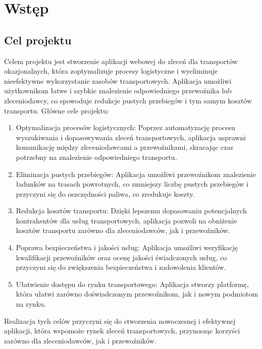 \chapter{Wstęp}

\section{Cel projektu}
Celem projektu jest stworzenie aplikacji webowej do zleceń dla transportów okazjonalnych, która zoptymalizuje procesy logistyczne i wyeliminuje nieefektywne wykorzystanie zasobów transportowych. Aplikacja umożliwi użytkownikom łatwe i szybkie znalezienie odpowiedniego przewoźnika lub zleceniodawcy, co spowoduje redukcje pustych przebiegów i tym samym kosztów transportu.
Główne cele projektu:
\begin{enumerate}[labelwidth=\widthof{\ref{last-item}},label=\arabic*.]
\item Optymalizacja procesów logistycznych: Poprzez automatyzację procesu wyszukiwania i dopasowywania zleceń transportowych, aplikacja usprawni komunikację między zleceniodawcami a przewoźnikami, skracając czas potrzebny na znalezienie odpowiedniego transportu.
\item Eliminacja pustych przebiegów: Aplikacja umożliwi przewoźnikom znalezienie ładunków na trasach powrotnych, co zmniejszy liczbę pustych przebiegów i przyczyni się do oszczędności paliwa, co zredukuje koszty.
\item Redukcja kosztów transportu: Dzięki lepszemu dopasowaniu potencjalnych kontrahentów dla usług transportowych, aplikacja pozwoli na obniżenie kosztów transportu zarówno dla zleceniodawców, jak i przewoźników.
\item Poprawa bezpieczeństwa i jakości usług: Aplikacja umożliwi weryfikację kwalifikacji przewoźników oraz ocenę jakości świadczonych usług, co przyczyni się do zwiększenia bezpieczeństwa i zadowolenia klientów.
\item Ułatwienie dostępu do rynku transportowego: Aplikacja stworzy platformę, która ułatwi zarówno doświadczonym przewoźnikom, jak i nowym podmiotom na rynku. \label{last-item}
\end{enumerate}

Realizacja tych celów przyczyni się do stworzenia nowoczesnej i efektywnej aplikacji, która wspomoże rynek zleceń transportowych, przynosząc korzyści zarówno dla zleceniodawców, jak i przewoźników.

